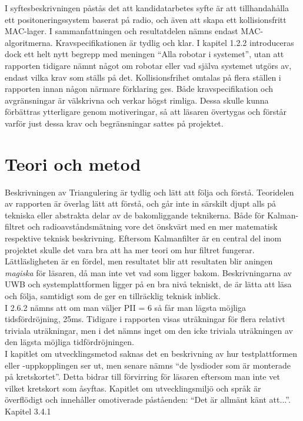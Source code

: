 \documentclass[a4paper,11pt]{article}
\begin{document}
I syftesbeskrivningen påstås det att kandidatarbetes syfte är att tillhandahålla ett positoneringssystem baserat på radio, och även att skapa ett kollisionsfritt MAC-lager. I sammanfattningen och resultatdelen nämns endast MAC-algoritmerna. Kravspecifikationen är tydlig och klar. I kapitel 1.2.2 introduceras dock ett helt nytt begrepp med meningen “Alla robotar i systemet”, utan att rapporten tidigare nämnt något om robotar eller vad själva systemet utgörs av, endast vilka krav som ställs på det. Kollisionsfrihet omtalas på flera ställen i rapporten innan någon närmare förklaring ges. Både kravspecifikation och avgränsningar är välskrivna och verkar högst rimliga. Dessa skulle kunna förbättras ytterligare genom motiveringar, så att läsaren övertygas och förstår varför just dessa krav och begränsningar sattes på projektet. \\ 

\section{Teori och metod}

Beskrivningen av Triangulering är tydlig och lätt att följa och förstå. Teoridelen av rapporten är överlag lätt att förstå, och går inte in särskilt djupt alls på tekniska eller abstrakta delar av de bakomliggande teknikerna. Både för Kalman-filtret och radioavståndsmätning vore det önskvärt med en mer matematisk respektive teknisk beskrivning. Eftersom Kalmanfilter är en central del inom projektet skulle det vara bra att ha mer teori om hur filtret fungerar. Lättläsligheten är en fördel, men resultatet blir att resultaten blir aningen \emph{magiska} för läsaren, då man inte vet vad som ligger bakom. Beskrivningarna av UWB och systemplattformen ligger på en bra nivå tekniskt, de är lätta att läsa och följa, samtidigt som de ger en tillräcklig teknisk inblick. \\

I 2.6.2 nämns att om man väljer PII = 6 så får man lägsta möjliga tidsfördröjning, 25ms. Tidigare i rapporten visas uträkningar för flera relativt triviala uträkningar, men i det nämns inget om den icke triviala uträkningen av den lägsta möjliga tidfördröjningen. \\

I kapitlet om utvecklingsmetod saknas det en beskrivning av hur testplattformen eller -uppkopplingen ser ut, men senare nämns “de lysdioder som är monterade på kretskortet”. Detta bidrar till förvirring för läsaren eftersom man inte vet vilket kretskort som åsyftas. Kapitlet om utvecklingsmiljö och språk är överflödigt och innehåller omotiverade påståenden: “Det är allmänt känt att...”. Kapitel 3.4.1 \\
\end{document}
